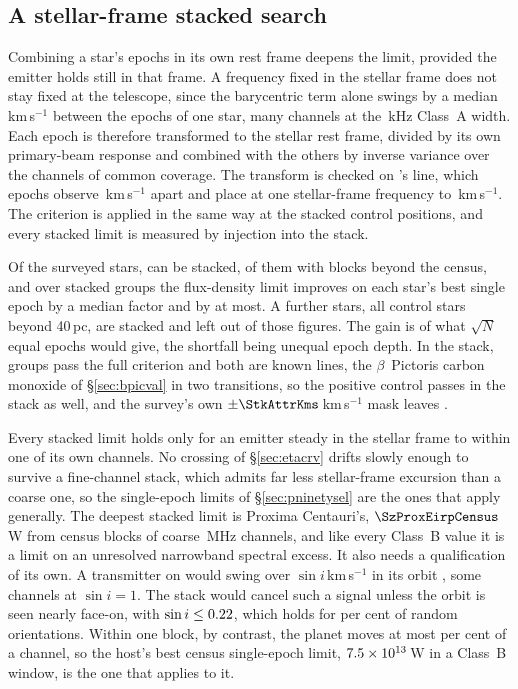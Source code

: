 \subsection{A stellar-frame stacked search}
\label{sec:stack}

Combining a star's epochs in its own rest frame deepens the limit, provided
the emitter holds still in that frame. A frequency fixed in the stellar
frame does not stay fixed at the telescope, since the barycentric term
alone swings by a median \StkVcorrSwingMed\,km\,s$^{-1}$ between the epochs
of one star, many channels at the \StkRefChanKHz\,kHz Class~A width. Each
epoch is therefore
transformed to the stellar rest frame, divided by its own primary-beam
response and combined with the others by inverse variance over the channels
of common coverage. The transform is checked on \StkPersistLineStar's line,
which \StkRegNEpoch{} epochs observe \StkRegTopoKms\,km\,s$^{-1}$ apart and
place at one stellar-frame frequency to \FrEpochStelKms\,km\,s$^{-1}$. The
criterion is applied in the same way at the stacked control positions, and
every stacked limit is measured by injection into the stack.

Of the surveyed stars, \SxStkStarCensus{} can be stacked, \SttNStkOneEb{} of
them with blocks beyond the census, and over \SyStkNGroup{} stacked groups
the flux-density limit improves on each star's best single epoch by a median
factor \SyStkGainMed{} and by \SyStkGainMax{} at most. A further
\SxStkStarOutside{} stars, all control stars beyond 40\,pc, are stacked and left
out of those figures. The gain is \StkGainVsN{} of what $\sqrt{N}$ equal
epochs would give, the shortfall being unequal epoch depth.
In the stack, \StkNSurvive{} groups pass the full criterion and both are
known lines, the $\beta$~Pictoris carbon monoxide of \S\ref{sec:bpicval} in two
transitions, so the positive control passes in the stack as well, and the
survey's own $\pm\StkAttrKms$\,km\,s$^{-1}$ mask leaves \StkUnattrClause.

Every stacked limit holds only for an emitter steady in the stellar frame to
within one of its own channels. No crossing of \S\ref{sec:etacrv} drifts
slowly enough to survive a fine-channel stack, which admits far less
stellar-frame excursion than a coarse one, so the single-epoch limits of
\S\ref{sec:pninetysel} are the ones that apply generally. The deepest
stacked limit is Proxima Centauri's, $\SzProxEirpCensus$\,W from
\SxProxEbCensus{} census blocks of coarse \ChanBModeMHz\,MHz channels, and
like every Class~B value it is a limit on an unresolved narrowband spectral
excess. It also needs a qualification of its own. A transmitter on
\PxPlanet{} would swing over \PxPPKms$\sin i$\,km\,s$^{-1}$ in its orbit
\citep{AngladaEscude2016,Kervella2017,NEA2013}, some \PxNChanWalk{} channels
at $\sin i=1$. The stack would cancel such a signal unless the orbit is seen
nearly face-on, with $\sin i\le0.22$, which holds for \PxIsoPct{} per
cent of random orientations. Within one block, by contrast, the planet moves at most
\PxBlockPct{} per cent of a channel, so the host's best census single-epoch
limit, $7.5\times10^{13}$\,W in a Class~B window, is the one that applies to it.
